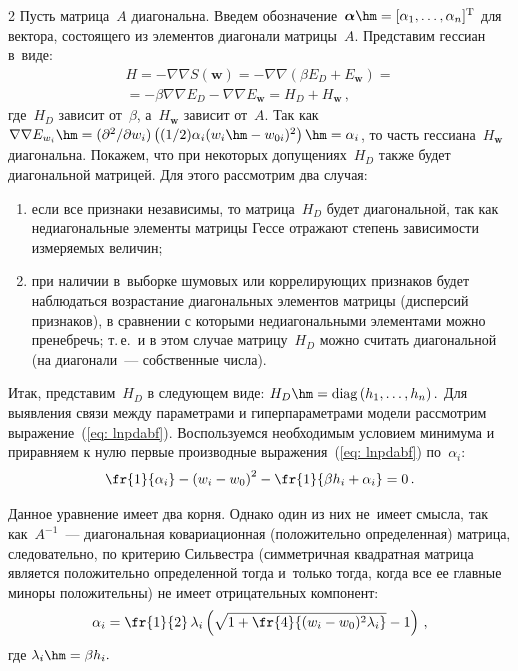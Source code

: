 \begin{multicols}{2}
Пусть матрица~$A$ диагональна. Введем
обозначение~$\boldsymbol{\alpha}\hm=[\alpha_1, \ldots ,\alpha_n]^{\mathrm{T}}$ для
вектора, состоящего из элементов диагонали матрицы~$A$. Представим
гессиан в~виде:
\begin{multline*}
H=- \nabla \nabla S(\mathbf{w})=-\nabla\nabla\left(\beta E_D + E_\mathbf{w}\right)={}\\
{}=
-\beta\nabla\nabla E_D-\nabla\nabla E_\mathbf{w}=H_D+H_{\mathbf{w}}\,,
\end{multline*}
где~$H_D$ зависит от~$\beta$, а~$H_\mathbf{w}$ зависит от~$A$.
Так как $\nabla\nabla E_{w_i}\hm=({\partial^2}/{\partial w_i}) 
\left((1/2)\alpha_i (w_i\hm-w_{0i})^2\right)\hm=\alpha_i$, то часть гессиана~$H_\mathbf{w}$ 
диагональна. Покажем, что при некоторых допущениях~$H_D$ также будет диагональной матрицей. 
Для этого рассмотрим два случая:
\begin{enumerate}[(1)]
  \item если все признаки независимы, то матрица~$H_D$ будет диагональной, 
  так как недиагональные элементы матрицы Гессе отражают степень зависимости 
  измеряемых величин;
  \item при наличии в~выборке шумовых или коррелирующих признаков будет 
  наблюдаться возрас\-та\-ние диагональных элементов матрицы (дисперсий признаков), 
  в сравнении с которыми недиагональными элементами можно пре\-неб\-речь; т.\,е.\ 
  и в этом случае матрицу~$H_D$ можно считать диагональной (на диагонали~--- 
  собственные числа).
\end{enumerate}

Итак, представим~$H_D$ в следующем виде: $H_D \hm=
\mathrm{diag}\left(h_1, \ldots ,h_n\right).$ Для выявления связи между параметрами
и гиперпараметрами модели рас\-смот\-рим выражение~(\ref{eq: lnpdabf}).
Воспользуемся необходимым условием минимума и приравняем к нулю
первые производные выражения~(\ref{eq: lnpdabf}) по~$\alpha_i$:
\begin{equation*}
\fr{1}{\alpha_i}-\left(w_{i}-w_{0}\right)^2-\fr{1}{\beta h_i+\alpha_i}=0\,.
\end{equation*}

Данное уравнение имеет два корня. Однако один из них не~имеет
смысла, так как~$A^{-1}$~--- диагональная ковариационная
(положительно определенная) матрица, следовательно, по критерию
Сильвестра (симметричная квадратная матрица является положительно
определенной тогда и~только тогда, когда все ее главные миноры
положительны) не имеет отрицательных компонент:
\begin{equation}
\label {eq: alfa}
\alpha_i=\fr{1}{2}\,\lambda_i\left(\sqrt{1+\fr{4}{(w_{i}-w_{0})^{2}\lambda_i}}-1\right)\,,
\end{equation}
где $\lambda_i\hm=\beta h_i.$


\end{multicols}
